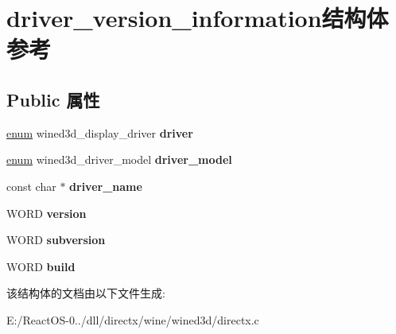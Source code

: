 \hypertarget{structdriver__version__information}{}\section{driver\+\_\+version\+\_\+information结构体 参考}
\label{structdriver__version__information}
\subsection*{Public 属性}
\begin{DoxyCompactItemize}
\item 
\mbox{\label{structdriver__version__information_ad7cb04b3dfa5bc8aa95f4fbd0dbc6ef7}} 
\hyperlink{interfaceenum}{enum} wined3d\+\_\+display\+\_\+driver {\bfseries driver}
\item 
\mbox{\label{structdriver__version__information_afd13b5d7ecb93fea503e1fa383ff2967}} 
\hyperlink{interfaceenum}{enum} wined3d\+\_\+driver\+\_\+model {\bfseries driver\+\_\+model}
\item 
\mbox{\label{structdriver__version__information_a41d94026e2dc95ac7d715467292768e2}} 
const char $\ast$ {\bfseries driver\+\_\+name}
\item 
\mbox{\label{structdriver__version__information_a272b927026919b450f246e0923675b5b}} 
W\+O\+RD {\bfseries version}
\item 
\mbox{\label{structdriver__version__information_af2f866cf24360dcf07c4538b0f6385aa}} 
W\+O\+RD {\bfseries subversion}
\item 
\mbox{\label{structdriver__version__information_a8e879cce0f0a1b94710b71c6aee0f3b6}} 
W\+O\+RD {\bfseries build}
\end{DoxyCompactItemize}


该结构体的文档由以下文件生成\+:\begin{DoxyCompactItemize}
\item 
E\+:/\+React\+O\+S-\/0../dll/directx/wine/wined3d/directx.\+c\end{DoxyCompactItemize}
